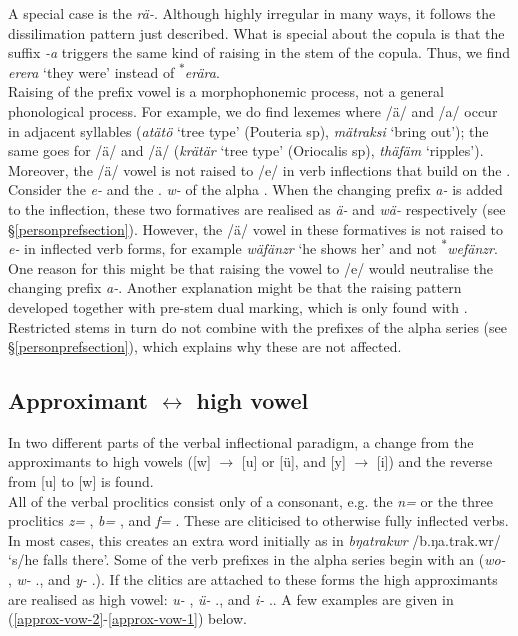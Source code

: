 A special case is the  \emph{rä-}. Although highly irregular in many ways, it follows the dissilimation pattern just described. What is special about the copula is that the  suffix \emph{-a} triggers the same kind of raising in the stem of the copula. Thus, we find \emph{erera} `they were' instead of \textsuperscript{$\ast$}\emph{erära}.\\

Raising of the prefix vowel is a morphophonemic process, not a general phonological process. For example, we do find lexemes where /ä/ and /a/ occur in adjacent syllables (\emph{atätö} `tree type' (Pouteria sp), \emph{mätraksi} `bring out'); the same goes for /ä/ and /ä/ (\emph{krätär} `tree type' (Oriocalis sp), \emph{thäfäm} `ripples'). Moreover, the /ä/ vowel is not raised to /e/ in verb inflections that build on the . Consider the \Stnsg{} \emph{e-} and the \Tsg.\F{} \emph{w-} of the alpha . When the  changing prefix \emph{a-} is added to the inflection, these two formatives are realised as \emph{ä-} and \emph{wä-} respectively (see \S{}\ref{personprefsection}). However, the /ä/ vowel in these formatives is not raised to \emph{e-} in inflected verb forms, for example \emph{wäfänzr} `he shows her' and not \textsuperscript{$\ast$}\emph{wefänzr}. One reason for this might be that raising the vowel to /e/ would neutralise the  changing prefix \emph{a-}. Another explanation might be that the raising pattern developed together with pre-stem dual marking, which is only found with . Restricted stems in turn do not combine with the prefixes of the alpha series (see \S{}\ref{personprefsection}), which explains why these are not affected.

\subsection[Approximant  ↔ high vowel]{Approximant $\leftrightarrow$ high vowel} \label{approxhighvowel}

In two different parts of the verbal inflectional paradigm, a change from the approximants to high vowels ([w] $\rightarrow$ [u] or [ü], and [y] $\rightarrow$ [i]) and the reverse from [u] to [w] is found.\\

All of the verbal proclitics consist only of a consonant, e.g. the  \emph{n=} or the three  proclitics \emph{z=} \Prox{}, \emph{b=} \Med{}, and \emph{f=} \Dist{}. These are cliticised to otherwise fully inflected verbs. In most cases, this creates an extra  word initially as in \emph{bŋatrakwr} /b.ŋa.trak.wr/ `s/he falls there'. Some of the verb prefixes in the alpha series begin with an  (\emph{wo-} \Fsg{}, \emph{w-} \Tsg.\F{}, and \emph{y-} \Tsg.\Masc{}). If the clitics are attached to these forms the high approximants are realised as high vowel: \emph{u-} \Fsg{}, \emph{ü-} \Tsg.\F{}, and \emph{i-} \Tsg.\Masc{}. A few examples are given in (\ref{approx-vow-2}-\ref{approx-vow-1}) below.

